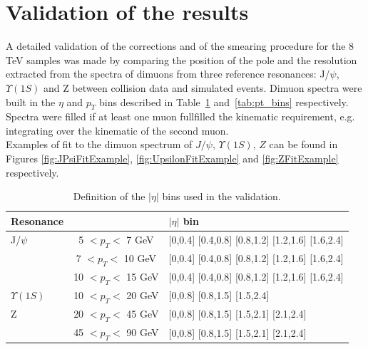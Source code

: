 \section{Validation of the results}
\label{sec:validation}
A detailed validation of the corrections and
of the smearing procedure for the 8 TeV samples was made by comparing the
position of the pole and the resolution extracted from the spectra of dimuons from
three reference resonances: J/$\psi$, $\Upsilon(1S)$ and Z between
collision data and simulated events. 
Dimuon spectra were built in the $\eta$ and $p_T$ bins described in
Table~\ref{tab:eta_bins} and~\ref{tab:pt_bins} respectively. 
Spectra were filled if at least one muon fullfilled the
kinematic requirement, e.g. integrating over the kinematic of the
second muon. \\
Examples of fit to the dimuon spectrum of $J/\psi,\, \Upsilon(1S),\, Z$ can be found in 
Figures \ref{fig:JPsiFitExample}, \ref{fig:UpsilonFitExample} and \ref{fig:ZFitExample} respectively.
\begin{table}[hbH]
\begin{center}
\caption{Definition of the $|\eta|$ bins used in the validation.\label{tab:eta_bins}}
\begin{tabular}{|l|cl|}
\hline
Resonance & & $|\eta|$ bin \\
\hline
J/$\psi$      &  5  $<p_T<$  7 GeV & [0,0.4] [0.4,0.8] [0.8,1.2] [1.2,1.6] [1.6,2.4] \\
              &  7  $<p_T<$ 10 GeV & [0,0.4] [0.4,0.8] [0.8,1.2] [1.2,1.6] [1.6,2.4] \\
              & 10  $<p_T<$ 15 GeV & [0,0.4] [0.4,0.8] [0.8,1.2] [1.2,1.6] [1.6,2.4] \\
\hline                    
$\Upsilon(1S)$& 10  $<p_T<$ 20 GeV & [0,0.8] [0.8,1.5] [1.5,2.4]\\
\hline                    
Z             & 20  $<p_T<$ 45 GeV & [0,0.8] [0.8,1.5] [1.5,2.1] [2.1,2.4] \\
              & 45  $<p_T<$ 90 GeV & [0,0.8] [0.8,1.5] [1.5,2.1] [2.1,2.4] \\
\hline
\end{tabular}
\end{center}
\end{table}
